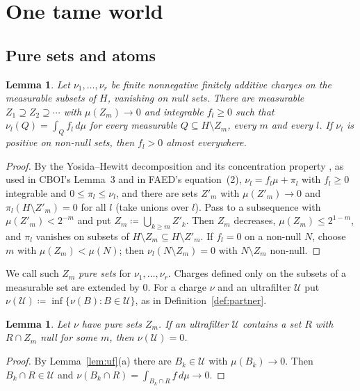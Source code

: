 \documentclass[11pt]{article}
\newtheorem{lemma}[theorem]{Lemma}
\theoremstyle{definition}\newtheorem{definition}[theorem]{Definition}
\theoremstyle{remark}\newtheorem{remark}[theorem]{Remark}
\newcommand{\Uf}{\mathcal U}
\begin{document}
\section{One tame world}\label{sec:tame}

\subsection{Pure sets and atoms}

\begin{lemma}\label{lem:YH}
Let $\nu_1,\dots,\nu_r$ be finite nonnegative finitely additive charges on
the measurable subsets of $H$, vanishing on null sets. There are measurable
$Z_1\supseteq Z_2\supseteq\cdots$ with $\mu(Z_m)\to0$ and integrable
$f_l\ge0$ such that $\nu_l(Q)=\int_Qf_l\,d\mu$ for every measurable
$Q\subseteq H\setminus Z_m$, every $m$ and every $l$. If $\nu_l$ is positive
on non-null sets, then $f_l>0$ almost everywhere.
\end{lemma}
\begin{proof}
By the Yosida--Hewitt decomposition \cite{YH} and its concentration
property \cite[Theorem~1 and its proof]{PP}, as used in CBOI's Lemma~3 and
in FAED's equation~(2), $\nu_l=f_l\mu+\pi_l$ with $f_l\ge0$ integrable and
$0\le\pi_l\le\nu_l$, and there are sets $Z'_m$ with $\mu(Z'_m)\to0$ and
$\pi_l(H\setminus Z'_m)=0$ for all $l$ (take unions over $l$). Pass to a
subsequence with $\mu(Z'_m)<2^{-m}$ and put $Z_m\coloneqq\bigcup_{k\ge m}Z'_k$.
Then $Z_m$ decreases, $\mu(Z_m)\le2^{1-m}$, and $\pi_l$ vanishes on subsets
of $H\setminus Z_m\subseteq H\setminus Z'_m$. If $f_l=0$ on a non-null $N$,
choose $m$ with $\mu(Z_m)<\mu(N)$; then $\nu_l(N\setminus Z_m)=0$ with
$N\setminus Z_m$ non-null.
\end{proof}

We call such $Z_m$ \emph{pure sets} for $\nu_1,\dots,\nu_r$. Charges defined
only on the subsets of a measurable set are extended by $0$. For a charge
$\nu$ and an ultrafilter $\Uf$ put $\nu(\Uf)\coloneqq\inf\{\nu(B):B\in\Uf\}$,
as in Definition~\ref{def:partner}.

\begin{lemma}\label{lem:atoms}
Let $\nu$ have pure sets $Z_m$. If an ultrafilter $\Uf$ contains a set $R$
with $R\cap Z_m$ null for some $m$, then $\nu(\Uf)=0$.
\end{lemma}
\begin{proof}
By Lemma~\ref{lem:uf}(a) there are $B_k\in\Uf$ with $\mu(B_k)\to0$. Then
$B_k\cap R\in\Uf$ and $\nu(B_k\cap R)=\int_{B_k\cap R}f\,d\mu\to0$.
\end{proof}
\end{document}
